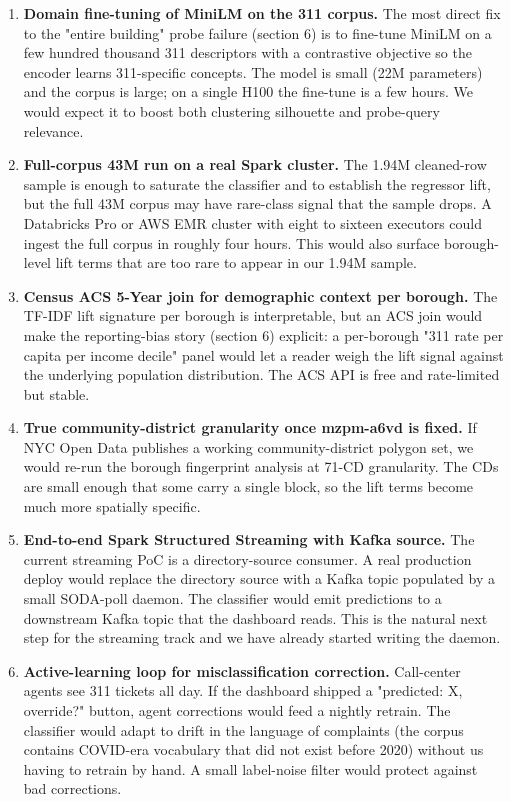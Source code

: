 \documentclass[11pt,letterpaper]{article}
\begin{document}
\begin{enumerate}
  \item \textbf{Domain fine-tuning of MiniLM on the 311 corpus.} The most direct fix to the "entire building" probe failure (section 6) is to fine-tune MiniLM on a few hundred thousand 311 descriptors with a contrastive objective so the encoder learns 311-specific concepts. The model is small (22M parameters) and the corpus is large; on a single H100 the fine-tune is a few hours. We would expect it to boost both clustering silhouette and probe-query relevance.
  \item \textbf{Full-corpus 43M run on a real Spark cluster.} The 1.94M cleaned-row sample is enough to saturate the classifier and to establish the regressor lift, but the full 43M corpus may have rare-class signal that the sample drops. A Databricks Pro or AWS EMR cluster with eight to sixteen executors could ingest the full corpus in roughly four hours. This would also surface borough-level lift terms that are too rare to appear in our 1.94M sample.
  \item \textbf{Census ACS 5-Year join for demographic context per borough.} The TF-IDF lift signature per borough is interpretable, but an ACS join would make the reporting-bias story (section 6) explicit: a per-borough "311 rate per capita per income decile" panel would let a reader weigh the lift signal against the underlying population distribution. The ACS API is free and rate-limited but stable.
  \item \textbf{True community-district granularity once mzpm-a6vd is fixed.} If NYC Open Data publishes a working community-district polygon set, we would re-run the borough fingerprint analysis at 71-CD granularity. The CDs are small enough that some carry a single block, so the lift terms become much more spatially specific.
  \item \textbf{End-to-end Spark Structured Streaming with Kafka source.} The current streaming PoC is a directory-source consumer. A real production deploy would replace the directory source with a Kafka topic populated by a small SODA-poll daemon. The classifier would emit predictions to a downstream Kafka topic that the dashboard reads. This is the natural next step for the streaming track and we have already started writing the daemon.
  \item \textbf{Active-learning loop for misclassification correction.} Call-center agents see 311 tickets all day. If the dashboard shipped a "predicted: X, override?" button, agent corrections would feed a nightly retrain. The classifier would adapt to drift in the language of complaints (the corpus contains COVID-era vocabulary that did not exist before 2020) without us having to retrain by hand. A small label-noise filter would protect against bad corrections.

\end{enumerate}
\end{document}
